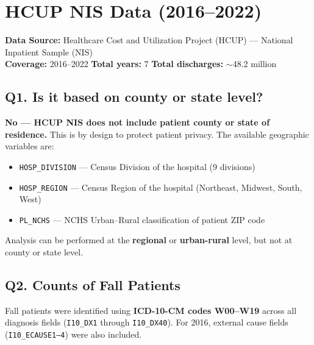 \documentclass[11pt, a4paper]{article}
\begin{document}
\vspace{10pt}

\section{HCUP NIS Data (2016--2022)}

\noindent\textbf{Data Source:} Healthcare Cost and Utilization Project (HCUP) --- National Inpatient Sample (NIS)\\
\textbf{Coverage:} 2016--2022 \quad \textbf{Total years:} 7 \quad \textbf{Total discharges:} $\sim$48.2 million

\vspace{6pt}

\subsection*{Q1. Is it based on county or state level?}
\begin{answerbox}
\textbf{No --- HCUP NIS does not include patient county or state of residence.} This is by design to protect patient privacy. The available geographic variables are:
\begin{itemize}[noitemsep]
  \item \texttt{HOSP\_DIVISION} --- Census Division of the hospital (9 divisions)
  \item \texttt{HOSP\_REGION} --- Census Region of the hospital (Northeast, Midwest, South, West)
  \item \texttt{PL\_NCHS} --- NCHS Urban--Rural classification of patient ZIP code
\end{itemize}
Analysis can be performed at the \textbf{regional} or \textbf{urban-rural} level, but not at county or state level.
\end{answerbox}

\vspace{6pt}

\subsection*{Q2. Counts of Fall Patients}
\begin{answerbox}
Fall patients were identified using \textbf{ICD-10-CM codes W00--W19} across all diagnosis fields (\texttt{I10\_DX1} through \texttt{I10\_DX40}). For 2016, external cause fields (\texttt{I10\_ECAUSE1--4}) were also included.
\end{answerbox}
\end{document}
